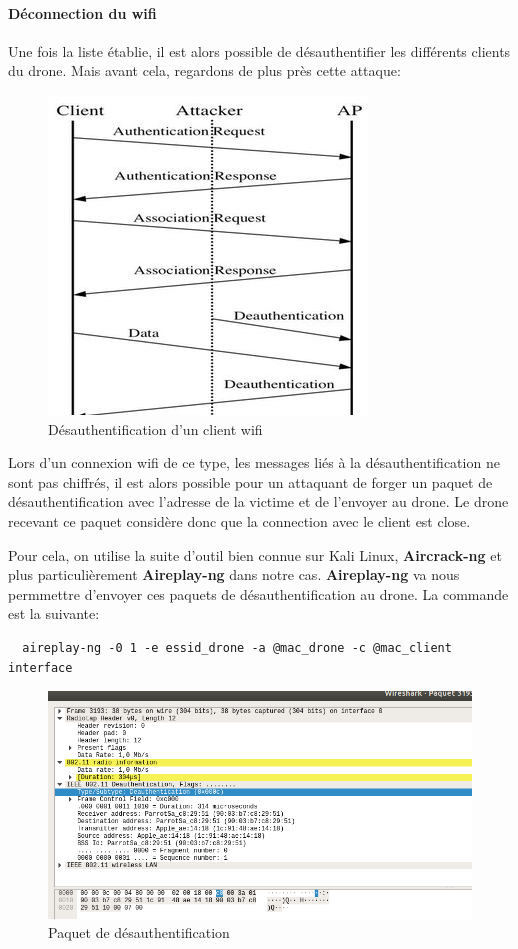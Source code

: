 \paragraph{Déconnection du wifi}
Une fois la liste établie, il est alors possible de désauthentifier les différents clients du drone. Mais avant cela, regardons de plus près cette attaque:

\begin{figure}[H]
  \centering
  \includegraphics[scale=1.3]{images/deauth}
  \caption{Désauthentification d'un client wifi}
\end{figure}

Lors d'un connexion wifi de ce type, les messages liés à la désauthentification ne sont pas chiffrés, il est alors possible pour un attaquant de forger un paquet de désauthentification avec l'adresse de la victime et de l'envoyer au drone. Le drone recevant ce paquet considère donc que la connection avec le client est close.


Pour cela, on utilise la suite d'outil bien connue sur Kali Linux, \textbf{Aircrack-ng} et plus particulièrement \textbf{Aireplay-ng} dans notre cas. \textbf{Aireplay-ng} va nous permmettre d'envoyer ces paquets de désauthentification au drone.
La commande est la suivante:
\begin{verbatim}
  aireplay-ng -0 1 -e essid_drone -a @mac_drone -c @mac_client interface
\end{verbatim}

\begin{figure}[H]
  \centering
  \includegraphics[scale=0.5]{images/wireshark}
  \caption{Paquet de désauthentification}
\end{figure}

